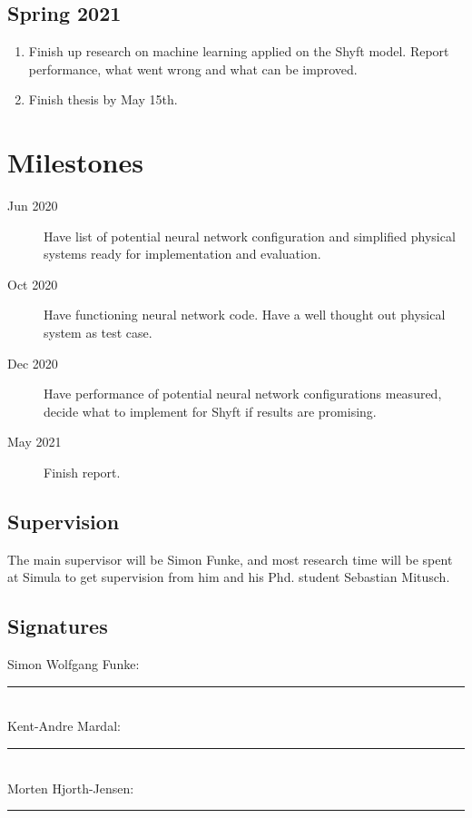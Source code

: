 \documentclass[a4paper,12pt,english]{article}
\begin{document}
\subsection{Spring 2021} 
\begin{enumerate}
\item Finish up research on machine learning applied on the Shyft model. Report performance, what went wrong and what can be improved.
\item Finish thesis by May 15th.
\end{enumerate}
\section{Milestones}
\begin{description}
\item[Jun 2020] Have list of potential neural network configuration and simplified physical systems ready for implementation and evaluation.
\item[Oct 2020] Have functioning neural network code. Have a well thought out physical system as test case.
\item[Dec 2020] Have performance of potential neural network configurations measured, decide what to implement for Shyft if results are promising.
\item[May 2021] Finish report.
\end{description}

\subsection{Supervision}
The main supervisor will be Simon Funke, and most research time will be spent at Simula to get supervision from him and his Phd. student Sebastian Mitusch. 

\subsection{Signatures}
Simon Wolfgang Funke: \\
\noindent\rule[0.5ex]{\linewidth}{1pt}\\

Kent-Andre Mardal: \\
\noindent\rule[0.5ex]{\linewidth}{1pt}\\

Morten Hjorth-Jensen: \\
\noindent\rule[0.5ex]{\linewidth}{1pt}\\



\end{document}
